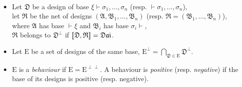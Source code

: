 \documentclass{LMCS}
\newcommand{\design}[1]{{\mathfrak{#1}}}
\newcommand{\designset}[1]{{\mathrm{#1}}}
\newcommand{\dai}{\design{Dai}}
\begin{document}
\begin{defi}~
\begin{itemize}
\item Let $\design{D}$ be a design of base $\xi \vdash \sigma_1, \dots, \sigma_n$ (resp. $\vdash \sigma_1, \dots, \sigma_n$), \\
let $\design{R}$ be the net of designs $(\design{A}, \design{B}_1, \dots, \design{B}_n)$ (resp. $\design{R} = (\design{B}_1, \dots, \design{B}_n)$), where $\design{A}$ has base $\vdash \xi$ and $\design{B}_i$ has base $\sigma_i \vdash$, \\
$\design{R}$ belongs to $\design{D}^\perp$ if $\psdes{\design{D}}{\design{R}} = \dai$. 
\item Let $\designset{E}$ be a set of designs of the same base, $\designset{E}^\perp = \bigcap_{\design{D} \in \designset{E}} \design{D}^\perp$.
\item $\designset{E}$ is a {\em behaviour} if $\designset{E} = \designset{E}^{\perp\perp}$.
A behaviour is {\em positive} (resp. {\em negative}) if the base of its designs is positive (resp. negative).
\end{itemize}
\end{defi}
\end{document}
